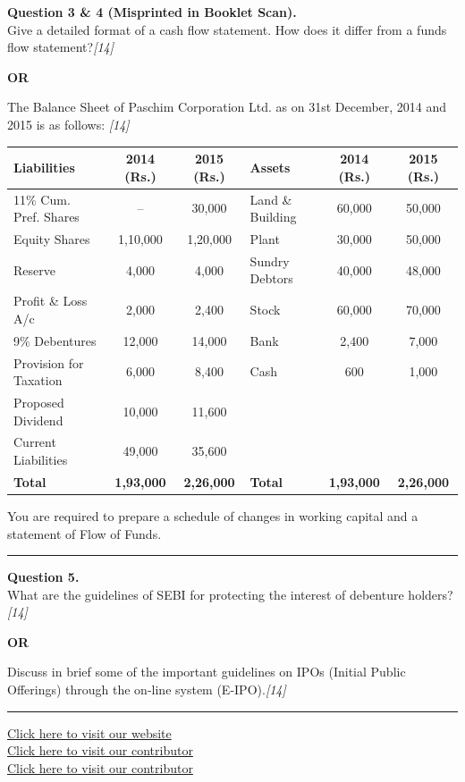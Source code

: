 \documentclass[11pt,a4paper]{article}
\newcommand{\pts}[1]{\hfill   \textit{[#1]}}
\begin{document}
\medskip




\noindent   \textbf{Question 3 \& 4 (Misprinted in Booklet Scan).}\\
Give a detailed format of a cash flow statement. How does it differ from a funds flow statement?\pts{14}

\centerline{   \textbf{OR}}

The Balance Sheet of Paschim Corporation Ltd. as on 31st December, 2014 and 2015 is as follows:
\pts{14}


\begin{center}
\small
\renewcommand{\arraystretch}{1.2}

\begin{tabular}{|l|c|c|l|c|c|}
\hline
   \textbf{Liabilities} &   \textbf{2014 (Rs.)} &   \textbf{2015 (Rs.)} &   \textbf{Assets} &   \textbf{2014 (Rs.)} &   \textbf{2015 (Rs.)} \\ \hline
11\% Cum. Pref. Shares & -- & 30,000 & Land \& Building & 60,000 & 50,000 \\
Equity Shares & 1,10,000 & 1,20,000 & Plant & 30,000 & 50,000 \\
Reserve & 4,000 & 4,000 & Sundry Debtors & 40,000 & 48,000 \\
Profit \& Loss A/c & 2,000 & 2,400 & Stock & 60,000 & 70,000 \\
9\% Debentures & 12,000 & 14,000 & Bank & 2,400 & 7,000 \\
Provision for Taxation & 6,000 & 8,400 & Cash & 600 & 1,000 \\
Proposed Dividend & 10,000 & 11,600 & & & \\
Current Liabilities & 49,000 & 35,600 & & & \\ \hline
   \textbf{Total} &   \textbf{1,93,000} &   \textbf{2,26,000} &   \textbf{Total} &   \textbf{1,93,000} &   \textbf{2,26,000} \\ \hline
\end{tabular}
\end{center}

You are required to prepare a schedule of changes in working capital and a statement of Flow of Funds.

\medskip\rule{\linewidth}{0.2pt}




\noindent   \textbf{Question 5.} \\
What are the guidelines of SEBI for protecting the interest of debenture holders?\pts{14}

\centerline{   \textbf{OR}}

Discuss in brief some of the important guidelines on IPOs (Initial Public Offerings) through the on-line system (E-IPO).\pts{14}

\vfill
\rule{\linewidth}{0.4pt}

\begin{center}\small
\href{https://bhu-exam.vercel.app/}{Click here to visit our website}\\[4pt]
\href{https://me-aryan.vercel.app/}{Click here to visit our contributor}\\[4pt]
\href{https://quashan-me.vercel.app/}{Click here to visit our contributor}
\end{center}
\end{document}
